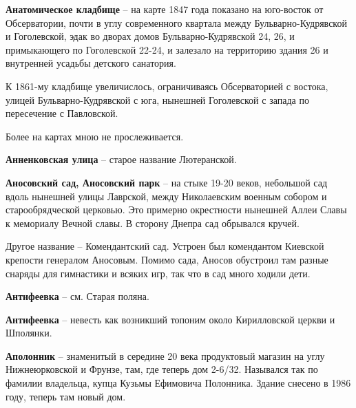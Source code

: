 \medskip


\textbf{Анатомическое кладбище} – на карте 
1847 года показано на юго-восток от Обсерватории, почти в углу современного квартала между Бульварно-Кудрявской и Гоголевской, эдак во дворах домов Бульварно-Кудрявской 24, 26, и примыкающего по Гоголевской 22-24, и залезало на территорию здания 26 и внутренней усадьбы детского санатория.

К 1861-му кладбище увеличислось, ограничиваясь Обсерваторией с востока, улицей Бульварно-Кудрявской с юга, нынешней Гоголевской с запада по пересечение с Павловской.

Более на картах мною не прослеживается.\\
\medskip


\textbf{Анненковская улица} – старое название Лютеранской.\\

\medskip


\textbf{Аносовский сад, Аносовский парк} – на стыке 19-20 веков, небольшой сад вдоль нынешней улицы Лаврской, между Николаевским военным собором и старообрядческой церковью. Это примерно окрестности нынешней Аллеи Славы к мемориалу Вечной славы. В сторону Днепра сад обрывался кручей.

Другое название – Комендантский сад. Устроен был комендантом Киевской крепости генералом Аносовым. Помимо сада, Аносов обустроил там разные снаряды для гимнастики и всяких игр, так что в сад много ходили дети.\\ 

\medskip


\textbf{Антифеевка} – см. Старая поляна.\\

\medskip


\textbf{Антифеевка} – невесть как возникший топоним около Кирилловской церкви и Шполянки.\\

\medskip



\textbf{Аполонник} – знаменитый в середине 20 века продуктовый магазин на углу Нижнеюрковской и Фрунзе, там, где теперь дом 2-6/32. Назывался так по фамилии владельца, купца Кузьмы Ефимовича Полонника. Здание снесено в 1986 году, теперь там новый дом.\\

